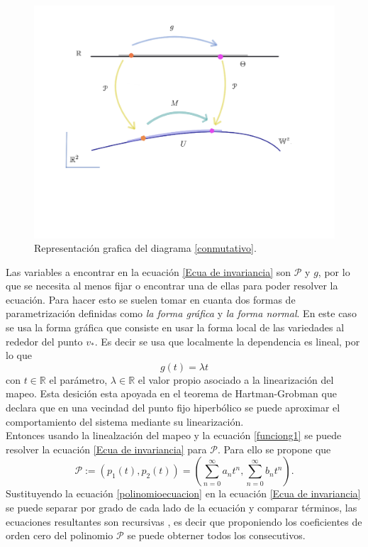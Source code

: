 \begin{figure}[h!]
	\centering
	\includegraphics[scale=0.4]{diagrama2}
	\caption{Representación grafica del diagrama \eqref{conmutativo}.}
	\label{diagrama-conmutativo}
\end{figure}

Las variables a encontrar en la ecuaci\'on \ref{Ecua de invariancia} son $\mathcal{P}$ y $g$, por lo que se necesita al menos fijar o encontrar una de ellas para poder resolver la ecuaci\'on. Para hacer esto se suelen tomar en cuanta dos formas de parametrizaci\'on definidas como \textit{la forma gr\'afica} y \textit{la forma normal}. En este caso se usa la forma gr\'afica que consiste en usar la forma local de las variedades al rededor del punto $v_{*}$. Es decir se usa que localmente la dependencia es lineal, por lo que 
\begin{equation}
g(t) = \lambda t
\label{funciong1}
\end{equation}
con $t\in \mathbb{R}$ el par\'ametro, $\lambda\in \mathbb{R}$ el valor propio asociado a la linearizaci\'on del mapeo. Esta desici\'on esta apoyada en el teorema de Hartman-Grobman que declara que en una vecindad del punto fijo hiperb\'olico se puede aproximar el comportamiento del sistema mediante su linearizaci\'on. \\

Entonces usando la linealzaci\'on del mapeo y la ecuaci\'on \eqref{funciong1} se puede resolver la ecuaci\'on \eqref{Ecua de invariancia} para $\mathcal{P}$. Para ello se propone que 
\begin{equation}
\mathcal{P} := (p_{1}(t), p_{2}(t)) =( \sum_{n=0}^{\infty}a_{n}t^{n}, \sum_{n=0}^{\infty}b_{n}t^{n}).
\label{polinomioecuacion}
\end{equation}
Sustituyendo la ecuaci\'on \eqref{polinomioecuacion} en la ecuaci\'on \eqref{Ecua de invariancia} se puede separar por grado de cada lado de la ecuaci\'on y comparar t\'erminos, las ecuaciones resultantes son recursivas , es decir que proponiendo los coeficientes de orden cero del polinomio $\mathcal{P}$ se puede obterner todos los consecutivos. 


